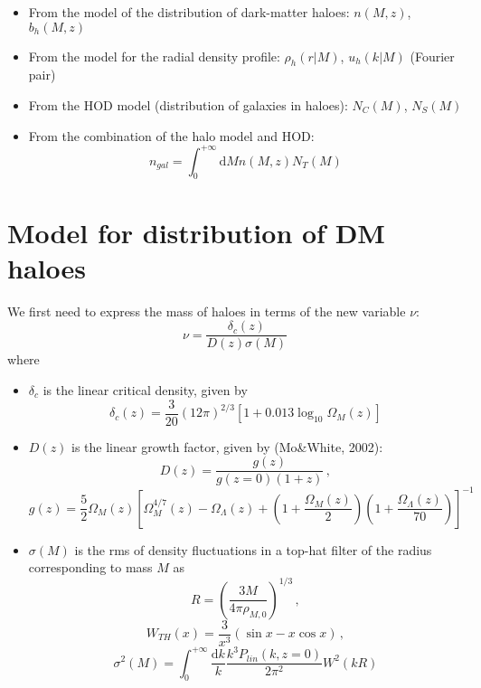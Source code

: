 \documentclass[10pt,a4paper]{article}
\begin{document}
\begin{itemize}
\item From the model of the distribution of dark-matter haloes: $n(M,z)$, $b_h(M,z)$
\item From the model for the radial density profile: $\rho_h(r|M)$, $u_h(k|M)$ (Fourier pair)
\item From the HOD model (distribution of galaxies in haloes): $N_C(M)$, $N_S(M)$
\item From the combination of the halo model and HOD:
\begin{equation}
n_{gal} = \int_0^{+\infty} \mathrm{d}M n(M,z) N_T(M)
\end{equation}
\end{itemize}



\section{Model for distribution of DM haloes}

We first need to express the mass of haloes in terms of the new variable $\nu$:
\begin{equation}
\nu = \frac{\delta_c(z)}{D(z)\sigma(M)}
\end{equation}
where
\begin{itemize}
\item $\delta_c$ is the linear critical density, given by
\begin{equation}
\delta_c(z) = \frac{3}{20} \left(12\pi\right)^{2/3} \left[ 1 + 0.013 \log_{10} \Omega_M(z)\right]
\end{equation}
\item $D(z)$ is the linear growth factor, given by (Mo\&White, 2002):
\begin{equation}
D(z) = \frac{g(z)}{g(z=0)(1+z)} \, ,
\end{equation}
\begin{equation}
g(z) = \frac{5}{2}\Omega_M(z) \left[ \Omega_M^{4/7}(z) - \Omega_{\Lambda}(z) + \left(1 + \frac{\Omega_M(z)}{2}\right)\left(1 + \frac{\Omega_{\Lambda}(z)}{70}\right)\right]^{-1}
\end{equation}
\item $\sigma(M)$ is the rms of density fluctuations in a top-hat filter of the radius corresponding to mass $M$ as
\begin{equation}
R = \left(\frac{3M}{4\pi \rho_{M,0}}\right)^{1/3} \, ,
\end{equation}
\begin{equation}
W_{TH}(x) = \frac{3}{x^3} \left( \sin x - x \cos x \right) \, ,
\end{equation}
\begin{equation}
\sigma^2(M) = \int_0^{+\infty} \frac{\mathrm{d}k}{k} \frac{k^3 P_{lin}(k, z=0)}{2\pi^2} W^2(kR)
\end{equation}
\end{itemize}
\end{document}

